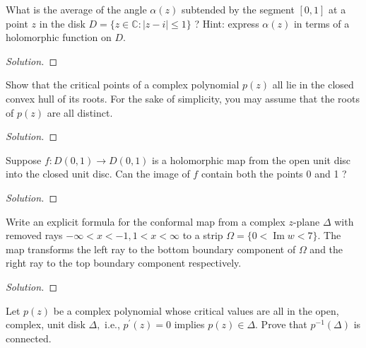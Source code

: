 \documentclass[10pt]{article}
\newenvironment{soln}{\begin{proof}[Solution]}{\end{proof}}
\providecommand{\abs}[1]{\left\lvert #1\right\rvert}
\begin{document}
\begin{problem}
[2013 J-I-1]
What is the average of the angle $\alpha(z)$ subtended by the segment $[0,1]$ at a point $z$ in the disk $D=\{z \in \mathbb{C} : \abs{z-i} \leq 1\}$ ? Hint: express $\alpha(z)$ in terms of a holomorphic function on $D.$
\end{problem}

\begin{soln}

\end{soln}



\begin{problem}
[2013 J-II-2]
Show that the critical points of a complex polynomial $p(z)$ all lie in the closed convex hull of its roots. For the sake of simplicity, you may assume that the roots of $p(z)$ are all distinct.
\end{problem}

\begin{soln}

\end{soln}



\begin{problem}
[2013 A-I-3]
Suppose $f: D(0,1) \rightarrow D(0,1)$ is a holomorphic map from the open unit disc into the closed unit disc. Can the image of $f$ contain both the points 0 and 1 ?
\end{problem}

\begin{soln}

\end{soln}



\begin{problem}
[2013 A-II-1]
Write an explicit formula for the conformal map from a complex $z$-plane $\Delta$ with removed rays $-\infty < x < -1,1 < x < \infty$ to a strip $\Omega=\{0 < \operatorname{Im} w < 7\}.$ The map transforms the left ray to the bottom boundary component of $\Omega$ and the right ray to the top boundary component respectively.
\end{problem}

\begin{soln}

\end{soln}



\begin{problem}
[2012 J-I-3]
Let $p(z)$ be a complex polynomial whose critical values are all in the open, complex, unit disk $\Delta,$ i.e., $p^{\prime}(z)=0$ implies $p(z) \in \Delta.$ Prove that $p^{-1}(\Delta)$ is connected.
\end{problem}
\end{document}
